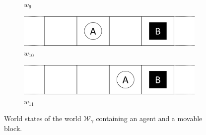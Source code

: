 \begin{figure}[H]
\begin{subfigure}{0.48\textwidth}
    \caption{$w_{9}$}
  \end{subfigure}%
    \vspace{0.5cm}
  \begin{subfigure}{0.48\textwidth}
    \centering
    \includegraphics[width=\textwidth]{5BeyondSBDRL/GlobalAlgebras/Images/Movable_block_world_states/w10.png}
    \caption{$w_{10}$}
  \end{subfigure}%
  \hfill
  \begin{subfigure}{0.48\textwidth}
    \centering
    \includegraphics[width=\textwidth]{5BeyondSBDRL/GlobalAlgebras/Images/Movable_block_world_states/w11.png}
    \caption{$w_{11}$}
  \end{subfigure}%
  \caption{World states of the world $\mathscr{W}_{\gamma}$ containing an agent and a movable block.}
  \label{fig:movable_block_world_states}
\end{figure}

